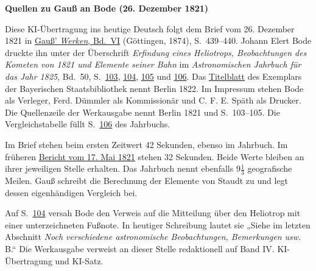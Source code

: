 \clearpage\thispagestyle{empty}
\begin{center}\textbf{Quellen zu Gauß an Bode (26. Dezember 1821)}\end{center}
\noindent Diese KI-Übertragung ins heutige Deutsch folgt dem Brief vom 26. Dezember 1821 in \href{https://gdz.sub.uni-goettingen.de/id/PPN236007467}{Gauß’ \textit{Werken}, Bd.~VI} (Göttingen, 1874), S.~439--440. Johann Elert Bode druckte ihn unter der Überschrift \textit{Erfindung eines Heliotrops, Beobachtungen des Kometen von 1821 und Elemente seiner Bahn} im \textit{Astronomischen Jahrbuch für das Jahr 1825}, Bd.~50, S.~\href{https://api.digitale-sammlungen.de/iiif/image/v2/bsb10538354_00109/full/1600,/0/default.jpg}{103}, \href{https://api.digitale-sammlungen.de/iiif/image/v2/bsb10538354_00110/full/1600,/0/default.jpg}{104}, \href{https://api.digitale-sammlungen.de/iiif/image/v2/bsb10538354_00111/full/1600,/0/default.jpg}{105} und \href{https://api.digitale-sammlungen.de/iiif/image/v2/bsb10538354_00112/full/1600,/0/default.jpg}{106}. Das \href{https://api.digitale-sammlungen.de/iiif/image/v2/bsb10538354_00003/full/1600,/0/default.jpg}{Titelblatt} des Exemplars der Bayerischen Staatsbibliothek nennt Berlin 1822. Im Impressum stehen Bode als Verleger, Ferd. Dümmler als Kommissionär und C. F. E. Späth als Drucker. Die Quellenzeile der Werkausgabe nennt Berlin 1821 und S.~103--105. Die Vergleichstabelle füllt S.~\href{https://api.digitale-sammlungen.de/iiif/image/v2/bsb10538354_00112/full/1600,/0/default.jpg}{106} des Jahrbuchs.
\par\smallskip\noindent Im Brief stehen beim ersten Zeitwert 42 Sekunden, ebenso im Jahrbuch. Im früheren \hyperlink{native-442-part-lower}{Bericht vom 17. Mai 1821} stehen 32 Sekunden. Beide Werte bleiben an ihrer jeweiligen Stelle erhalten. Das Jahrbuch nennt ebenfalls $9\tfrac{1}{3}$ geografische Meilen. Gauß schreibt die Berechnung der Elemente von Staudt zu und legt dessen eigenhändigen Vergleich bei.
\par\smallskip\noindent Auf S.~\href{https://api.digitale-sammlungen.de/iiif/image/v2/bsb10538354_00110/full/1600,/0/default.jpg}{104} versah Bode den Verweis auf die Mitteilung über den Heliotrop mit einer unterzeichneten Fußnote. In heutiger Schreibung lautet sie „Siehe im letzten Abschnitt \textit{Noch verschiedene astronomische Beobachtungen, Bemerkungen usw.} B.“ Die Werkausgabe verweist an dieser Stelle redaktionell auf Band IV. KI-Übertragung und KI-Satz.
\clearpage
